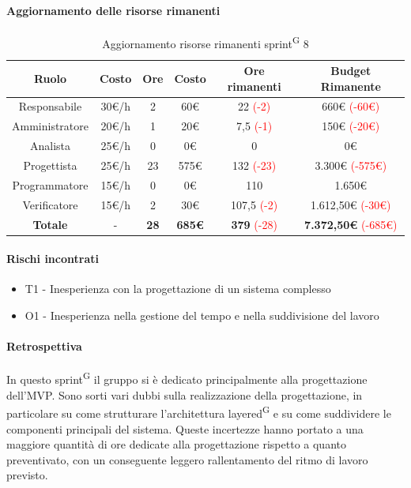 \documentclass[a4paper, 11pt]{article}
\newcommand{\subsubsubsection}[1]{\paragraph{#1}}
\renewcommand{\arraystretch}{1.4} %
\begin{document}
\subsubsubsection{Aggiornamento delle risorse rimanenti}
\begin{table}[H]
	\centering
	\renewcommand{\arraystretch}{1.5}
	
	\begin{tabular}{|c|c|c|c|c|c|}
		\hline
		\textcolor{AccentColor}{\textbf{Ruolo}} &
		\textcolor{AccentColor}{\textbf{Costo}} &
		\textcolor{AccentColor}{\textbf{Ore}} &
		\textcolor{AccentColor}{\textbf{Costo}} &
		\textcolor{AccentColor}{\textbf{Ore rimanenti}} &
		\textcolor{AccentColor}{\textbf{Budget Rimanente}} \\ \hline
		
		Responsabile   & 30€/h & 2    & 60€     & 22 \textcolor{red}{(-2)}      & 660€ \textcolor{red}{(-60€)}      \\ \hline
		Amministratore & 20€/h & 1    & 20€     & 7,5 \textcolor{red}{(-1)}     & 150€ \textcolor{red}{(-20€)}      \\ \hline
		Analista       & 25€/h & 0    & 0€      & 0                             & 0€                                \\ \hline
		Progettista    & 25€/h & 23   & 575€    & 132 \textcolor{red}{(-23)}    & 3.300€ \textcolor{red}{(-575€)}   \\ \hline
		Programmatore  & 15€/h & 0    & 0€      & 110                           & 1.650€                            \\ \hline
		Verificatore   & 15€/h & 2    & 30€     & 107,5 \textcolor{red}{(-2)}   & 1.612,50€ \textcolor{red}{(-30€)} \\ \hline
		\textbf{Totale} & - & \textbf{28} & \textbf{685€} & \textbf{379} \textcolor{red}{(-28)} & \textbf{7.372,50€} \textcolor{red}{(-685€)} \\ \hline
	\end{tabular}
	\caption{Aggiornamento risorse rimanenti sprint\textsuperscript{G} 8}
\end{table}

\subsubsubsection{Rischi incontrati}
\begin{itemize}
	\item T1 - Inesperienza con la progettazione di un sistema complesso
	\item O1 - Inesperienza nella gestione del tempo e nella suddivisione del lavoro
\end{itemize}

\subsubsubsection{Retrospettiva}
In questo sprint\textsuperscript{G} il gruppo si è dedicato principalmente alla progettazione dell'MVP.
Sono sorti vari dubbi sulla realizzazione della progettazione, in particolare su come strutturare l'architettura layered\textsuperscript{G} e su come suddividere le componenti principali del sistema. Queste incertezze hanno portato a una maggiore quantità di ore dedicate alla progettazione rispetto a quanto preventivato, con un conseguente leggero rallentamento del ritmo di lavoro previsto.\\
\\
\end{document}
